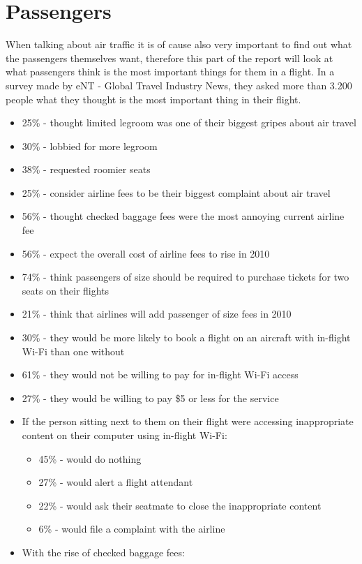 \section{Passengers}
When talking about air traffic it is of cause also very important to find out what the passengers themselves want, therefore this part of the report will look at what passengers think is the most important things for them in a flight.
In a survey made by eNT - Global Travel Industry News, they asked more than 3.200 people what they thought is the most important thing in their flight.
\begin{itemize}
\item 25\% - thought limited legroom was one of their biggest gripes about air travel
\item 30\% - lobbied for more legroom
\item 38\% - requested roomier seats
\item 25\% - consider airline fees to be their biggest complaint about air travel
\item 56\% - thought checked baggage fees were the most annoying current airline fee
\item 56\% - expect the overall cost of airline fees to rise in 2010
\item 74\% - think passengers of size should be required to purchase tickets for two seats on their flights
\item 21\% - think that airlines will add passenger of size fees in 2010
\item 30\% - they would be more likely to book a flight on an aircraft with in-flight Wi-Fi than one without
\item 61\% - they would not be willing to pay for in-flight Wi-Fi access
\item 27\% - they would be willing to pay \$5 or less for the service
\item If the person sitting next to them on their flight were accessing inappropriate content on their computer using in-flight Wi-Fi:
\begin{itemize}
\item 45\% - would do nothing
\item 27\% - would alert a flight attendant
\item 22\% - would ask their seatmate to close the inappropriate content
\item 6\% - would file a complaint with the airline
\end{itemize}
\item With the rise of checked baggage fees:

\end{itemize}
